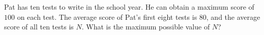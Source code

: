 Pat has ten tests to write in the school year. He can obtain a maximum score of $100$ on each test. The average score of Pat's first eight tests is $80$, and the average score of all ten tests is $N$. What is the maximum possible value of $N$?
